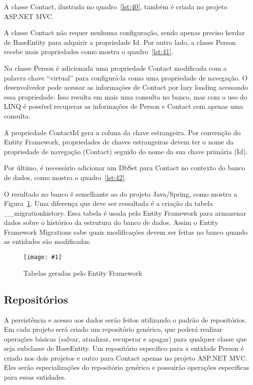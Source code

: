 \documentclass[a4paper,12pt]{article}
\newcommand{\figura}[3] {
	\begin{figure}[ht]
		\centering
		\texttt{[image: \#1]}
		\caption{#2}
		\label{#3}
	\end{figure}
	\FloatBarrier
}
\newcommand{\sharpcode}[3] {
	
}
\begin{document}
A classe Contact, ilustrada no quadro~\ref{lst:40}, também é criada no projeto ASP.NET MVC.

\sharpcode{code/40.txt}{Classe Contact no projeto ASP.NET MVC}{lst:40}

A classe Contact não requer nenhuma configuração, sendo apenas preciso herdar de BaseEntity para adquirir a propriedade Id. Por outro lado, a classe Person recebe mais propriedades como mostra o quadro~\ref{lst:41}.

\sharpcode{code/41.txt}{Classe Person no projeto ASP.NET com novas propriedades}{lst:41}

Na classe Person é adicionada uma propriedade Contact modificada com a palavra chave “virtual” para configurá-la como uma propriedade de navegação. O desenvolvedor pode acessar as informações de Contact por lazy loading acessando essa propriedade.  Isso resulta em mais uma consulta no banco, mas com o uso do LINQ é possível recuperar as informações de Person e Contact com apenas uma consulta.

A propriedade ContactId gera a coluna da chave estrangeira. Por convenção do Entity Framework, propriedades de chaves estrangeiras devem ter o nome da propriedade de navegação (Contact) seguido do nome da sua chave primária (Id).

Por último, é necessário adicionar um DbSet para Contact no contexto do banco de dados, como mostra o quadro~\ref{lst:42}.

\sharpcode{code/42.txt}{Classe NetWebCrudContext com o DbSet para Contact}{lst:42}

O resultado no banco é semelhante ao do projeto Java/Spring, como mostra a Figura~\ref{fig:37}. Uma diferença que deve ser ressaltada é a criação da tabela \_\_migrationhistory. Essa tabela é usada pelo Entity Framework para armazenar dados sobre o histórico da estrutura do banco de dados. Assim o Entity Framework Migrations sabe quais modificações devem ser feitas no banco quando as entidades são modificadas.

\figura{37.png}{Tabelas geradas pelo Entity Framework}{fig:37}

\subsection{Repositórios}

A persistência e acesso aos dados serão feitos utilizando o padrão de repositórios. Em cada projeto será criado um repositório genérico, que poderá realizar operações básicas (salvar, atualizar, recuperar e apagar) para qualquer classe que seja subclasse de BaseEntity. Um repositório especifico para a entidade Person é criado nos dois projetos e outro para Contact apenas no projeto ASP.NET MVC. Eles serão especializações do repositório genérico e possuirão operações especificas para essas entidades.
\end{document}
